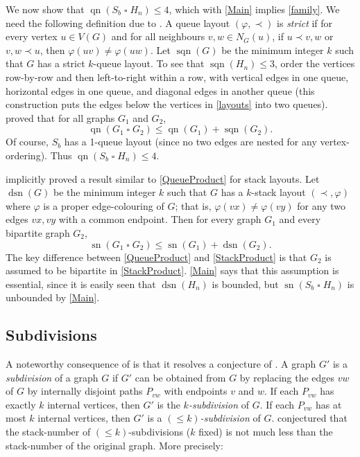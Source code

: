 \documentclass[kpfonts]{patmorin}
\DeclareMathOperator{\sn}{sn}
\DeclareMathOperator{\qn}{qn}
\DeclareMathOperator{\sqn}{sqn}
\DeclareMathOperator{\dsn}{dsn}
\renewcommand{\leq}{\leqslant}
\newcommand{\CartProd}{\mathbin{\square}}
\begin{document}
We now show that $\qn(S_b\CartProd H_n)\leq 4$, which with \cref{Main} implies \cref{family}. We need the following definition due to \citet{Wood-Queue-DMTCS05}. A queue layout $(\varphi,\prec)$ is \emph{strict} if for every vertex $u\in V(G)$ and for all neighbours $v,w\in N_G(u)$, if $u\prec v,w$ or $v,w \prec u$, then $\varphi(uv)\neq \varphi(uw)$. Let $\sqn(G)$ be the minimum integer $k$ such that $G$ has a strict $k$-queue layout. To see that $\sqn(H_n) \leq 3$, order the vertices row-by-row and then left-to-right within a row, with vertical edges in one queue, horizontal edges in one queue, and diagonal edges in another queue (this construction puts the edges below the vertices in \cref{layouts} into two queues). \citet{Wood-Queue-DMTCS05} proved that for all graphs $G_1$ and $G_2$,
\begin{equation}
\label{QueueProduct}
\qn(G_1 \CartProd G_2) \leq \qn(G_1) + \sqn(G_2).
\end{equation}
Of course, $S_b$ has a 1-queue layout (since no two edges are nested for any vertex-ordering). Thus $\qn(S_b \CartProd H_n)\leq 4$.

\citet{BK79} implicitly proved a result similar to \cref{QueueProduct} for stack layouts. Let $\dsn(G)$ be the minimum integer $k$ such that $G$ has a $k$-stack layout $(\prec,\varphi)$ where $\varphi$ is a proper edge-colouring of $G$; that is, $\varphi(vx)\neq\varphi(vy)$ for any two edges $vx,vy$ with a common endpoint. Then for every graph $G_1$ and every bipartite graph $G_2$,
\begin{equation}
\label{StackProduct}
\sn(G_1 \CartProd G_2) \leq \sn(G_1) + \dsn(G_2).
\end{equation}
The key difference between \cref{QueueProduct} and \cref{StackProduct} is that $G_2$ is assumed to be bipartite in \cref{StackProduct}. \cref{Main} says that this assumption is essential, since it is easily seen that $\dsn(H_n)$ is bounded, but $\sn(S_b \CartProd H_n)$ is unbounded by \cref{Main}.


\subsection*{Subdivisions}

A noteworthy consequence of  is that it resolves a conjecture of \citet{BO99}. A graph $G'$ is a \textit{subdivision} of a graph $G$ if $G'$ can be obtained from $G$ by replacing the edges $vw$ of $G$ by internally disjoint paths $P_{vw}$ with endpoints $v$ and $w$. If each $P_{vw}$ has exactly $k$ internal vertices, then $G'$ is the \emph{$k$-subdivision} of $G$. If each $P_{vw}$ has at most $k$ internal vertices, then $G'$ is a \emph{$(\leq k)$-subdivision} of $G$. \citet{BO99} conjectured that the stack-number of $(\leq k)$-subdivisions ($k$ fixed)  is not much less than the stack-number of the original graph. More precisely:
\end{document}
